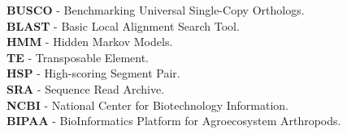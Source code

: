 \textbf{BUSCO} - Benchmarking Universal Single-Copy Orthologs.\\
\textbf{BLAST} - Basic Local Alignment Search Tool.\\
\textbf{HMM} - Hidden Markov Models.\\
\textbf{TE} - Transposable Element.\\
\textbf{HSP} - High-scoring Segment Pair.\\
\textbf{SRA} - Sequence Read Archive.\\
\textbf{NCBI} - National Center for Biotechnology Information.\\
\textbf{BIPAA} - BioInformatics Platform for Agroecosystem Arthropods.\\





